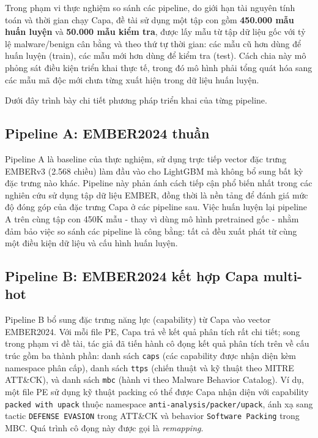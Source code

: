 Trong phạm vi thực nghiệm so sánh các pipeline, do giới hạn tài nguyên
tính toán và thời gian chạy Capa, đề tài sử dụng một tập con gồm
\textbf{450.000 mẫu huấn luyện} và \textbf{50.000 mẫu kiểm tra},
được lấy mẫu từ tập dữ liệu gốc với tỷ lệ
malware/benign cân bằng và theo thứ tự thời gian: các mẫu cũ hơn
dùng để huấn luyện (train), các mẫu mới hơn dùng để kiểm tra (test).
Cách chia này mô phỏng sát
điều kiện triển khai thực tế, trong đó mô hình phải tổng quát hóa
sang các mẫu mã độc mới chưa từng xuất hiện trong dữ liệu huấn luyện.

Dưới đây trình bày chi tiết phương pháp triển khai của từng pipeline.

\subsection{Pipeline A: EMBER2024 thuần}

Pipeline A là baseline của thực nghiệm, sử dụng trực tiếp vector đặc
trưng EMBERv3 (2.568 chiều) làm đầu vào cho LightGBM mà không bổ sung
bất kỳ đặc trưng nào khác. Pipeline này phản ánh cách tiếp cận phổ
biến nhất trong các nghiên cứu sử dụng tập dữ liệu EMBER, đồng thời
là nền tảng để đánh giá mức độ đóng góp của đặc trưng Capa ở các
pipeline sau. Việc huấn luyện lại pipeline A trên cùng tập con 450K
mẫu - thay vì dùng mô hình pretrained gốc - nhằm đảm bảo việc so
sánh các pipeline là công bằng: tất cả đều xuất phát từ cùng một điều
kiện dữ liệu và cấu hình huấn luyện.

\subsection{Pipeline B: EMBER2024 kết hợp Capa multi-hot}

Pipeline B bổ sung đặc trưng năng lực (capability) từ Capa vào vector EMBER2024.
Với mỗi file PE, Capa trả về kết quả phân tích rất chi tiết;
song trong phạm vi đề tài, tác giả đã tiến hành cô đọng
kết quả phân tích trên về cấu trúc gồm ba thành phần:
danh sách \texttt{caps} (các
capability được nhận diện kèm namespace phân cấp), danh sách
\texttt{ttps} (chiến thuật và kỹ thuật theo MITRE ATT\&CK), và danh
sách \texttt{mbc} (hành vi theo Malware Behavior Catalog). Ví dụ, một
file PE sử dụng kỹ thuật packing có thể được Capa nhận diện với
capability \texttt{packed with upack} thuộc namespace
\texttt{anti-analysis/packer/upack}, ánh xạ sang tactic
\texttt{DEFENSE EVASION} trong ATT\&CK và behavior
\texttt{Software Packing} trong MBC. Quá trình
cô đọng này được gọi là \textit{remapping}.


